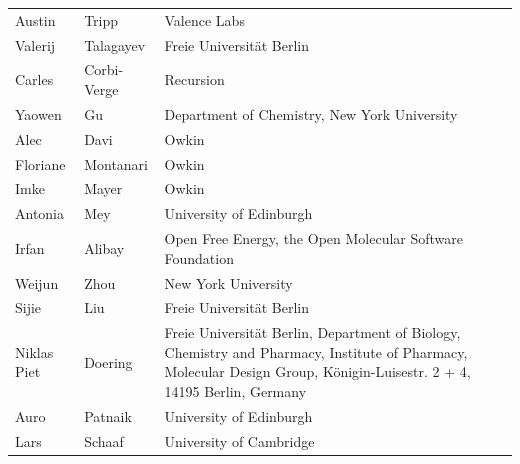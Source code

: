 \documentclass{article}
\begin{document}
\begin{table}[]
\begin{tabular}{lll}
\rowcolor[HTML]{FFFFFF} 
{\color[HTML]{434343} Austin} & {\color[HTML]{434343} Tripp} & {\color[HTML]{434343} Valence Labs} \\
\rowcolor[HTML]{F8F9FA} 
{\color[HTML]{434343} Valerij} & {\color[HTML]{434343} Talagayev} & {\color[HTML]{434343} Freie Universität Berlin} \\
\rowcolor[HTML]{FFFFFF} 
{\color[HTML]{434343} Carles} & {\color[HTML]{434343} Corbi-Verge} & {\color[HTML]{434343} Recursion} \\
\rowcolor[HTML]{F8F9FA} 
{\color[HTML]{434343} Yaowen} & {\color[HTML]{434343} Gu} & {\color[HTML]{434343} Department of Chemistry, New York University} \\
\rowcolor[HTML]{FFFFFF} 
{\color[HTML]{434343} Alec} & {\color[HTML]{434343} Davi} & {\color[HTML]{434343} Owkin} \\
\rowcolor[HTML]{F8F9FA} 
{\color[HTML]{434343} Floriane} & {\color[HTML]{434343} Montanari} & {\color[HTML]{434343} Owkin} \\
\rowcolor[HTML]{FFFFFF} 
{\color[HTML]{434343} Imke} & {\color[HTML]{434343} Mayer} & {\color[HTML]{434343} Owkin} \\
\rowcolor[HTML]{F8F9FA} 
{\color[HTML]{434343} Antonia} & {\color[HTML]{434343} Mey} & {\color[HTML]{434343} University of Edinburgh} \\
\rowcolor[HTML]{FFFFFF} 
{\color[HTML]{434343} Irfan} & {\color[HTML]{434343} Alibay} & {\color[HTML]{434343} Open Free Energy, the Open Molecular Software Foundation} \\
\rowcolor[HTML]{F8F9FA} 
{\color[HTML]{434343} Weijun} & {\color[HTML]{434343} Zhou} & {\color[HTML]{434343} New York University} \\
\rowcolor[HTML]{FFFFFF} 
{\color[HTML]{434343} Sijie} & {\color[HTML]{434343} Liu} & {\color[HTML]{434343} Freie Universität Berlin} \\
\rowcolor[HTML]{F8F9FA} 
{\color[HTML]{434343} Niklas Piet} & {\color[HTML]{434343} Doering} & {\color[HTML]{434343} Freie Universität Berlin, Department of Biology, Chemistry and Pharmacy, Institute of Pharmacy, Molecular Design Group, Königin-Luisestr. 2 + 4, 14195 Berlin, Germany} \\
\rowcolor[HTML]{FFFFFF} 
{\color[HTML]{434343} Auro} & {\color[HTML]{434343} Patnaik} & {\color[HTML]{434343} University of Edinburgh} \\
\rowcolor[HTML]{F8F9FA} 
{\color[HTML]{434343} Lars} & {\color[HTML]{434343} Schaaf} & {\color[HTML]{434343} University of Cambridge} \\

\end{tabular}
\end{table}
\end{document}
